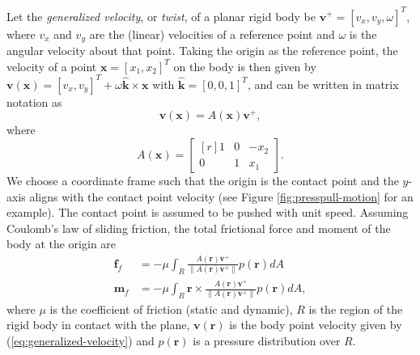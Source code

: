 \documentclass[conference]{IEEEtran}
\DeclareMathOperator{\sign}{\text{sgn}}
\newcommand{\EH}[1]{{\color{blue} {Eric: {#1}}  }}
\begin{document}
Let the \textit{generalized velocity}, or \textit{twist}, of a planar
rigid body be $\mathbf{v}^+ = [v_x, v_y, \omega]^T$, where $v_x$ and
$v_y$ are the (linear) velocities of a reference point and $\omega$ is
the angular velocity about that point. Taking the origin as the
reference point, the velocity of a point $\mathbf{x} = [x_1,x_2]^T$ on
the body is then given by
$\mathbf{v}(\mathbf{x}) = [v_x, v_y]^T + \omega\hat{\mathbf{k}} \times
\mathbf{x}$
with $\hat{\mathbf{k}} = [0,0,1]^T$, and can be written in matrix
notation as
\begin{equation} \label{eq:generalized-velocity}
\mathbf{v}(\mathbf{x}) = A(\mathbf{x})\mathbf{v}^+,
\end{equation}
where
\begin{equation}
  A(\mathbf{x}) = 
  \begin{bmatrix*}[r]
    1 & 0 & -x_2 \\
    0 & 1 &  x_1
  \end{bmatrix*}.
\end{equation}
We choose a coordinate frame such that the origin is the contact point
and the $y$-axis aligns with the contact point velocity (see Figure
\ref{fig:presspull-motion} for an example). The contact point is
assumed to be pushed with unit speed. Assuming Coulomb's law of
sliding friction, the total frictional force and moment of the body at
the origin are
\begin{align}
  \mathbf{f}_f &= -\mu\int_{R}\frac{A(\mathbf{r})\mathbf{v}^+}{\lVert A(\mathbf{r})\mathbf{v}^+ \rVert} p(\mathbf{r}) dA \label{eq:force-at-contact} \\
  \mathbf{m}_f &= -\mu\int_{R}\mathbf{r}\times\frac{A(\mathbf{r})\mathbf{v}^+}{\lVert A(\mathbf{r})\mathbf{v}^+ \rVert} p(\mathbf{r}) dA, \label{eq:moment-at-contact}
\end{align}
where $\mu$ is the coefficient of friction (static and dynamic), $R$
is the region of the rigid body in contact with the plane,
$\mathbf{v}(\mathbf{r})$ is the body point velocity given by
(\ref{eq:generalized-velocity}) and $p(\mathbf{r})$ is a pressure
distribution over $R$.
\end{document}
